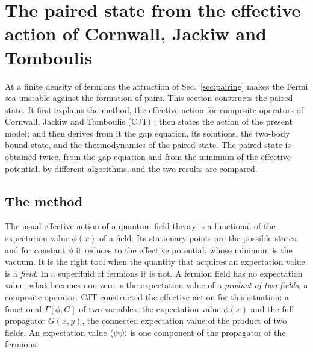 
\section{The paired state from the effective action of Cornwall, Jackiw and Tomboulis}
\label{sec:cjt}

At a finite density of fermions the attraction of Sec.~\ref{sec:pairing} makes the Fermi sea unstable
against the formation of pairs. This section constructs the paired state. It first explains the
method, the effective action for composite operators of Cornwall, Jackiw and Tomboulis (CJT)
\cite{CJT1974}; then states the action of the present model; and then derives from it the gap
equation, its solutions, the two-body bound state, and the thermodynamics of the paired state. The
paired state is obtained twice, from the gap equation and from the minimum of the effective potential,
by different algorithms, and the two results are compared.

\subsection{The method}
\label{sec:method}

The usual effective action of a quantum field theory is a functional of the expectation value
$\phi(x)$ of a field. Its stationary points are the possible states, and for constant $\phi$ it
reduces to the effective potential, whose minimum is the vacuum. It is the right tool when the
quantity that acquires an expectation value is a \emph{field}. In a superfluid of fermions it is not.
A fermion field has no expectation value; what becomes non-zero is the expectation value of a
\emph{product of two fields}, a composite operator. CJT constructed the effective action for this
situation: a functional $\Gamma[\phi,G]$ of two variables, the expectation value $\phi(x)$ and the full
propagator $G(x,y)$, the connected expectation value of the product of two fields. An expectation
value $\langle\psi\psi\rangle$ is one component of the propagator of the fermions.

